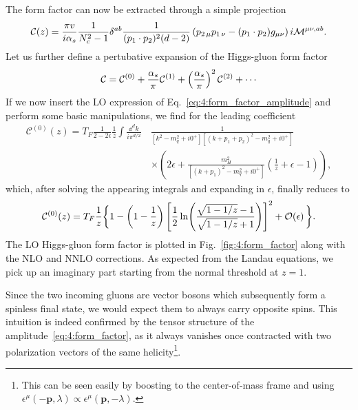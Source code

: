 The form factor can now be extracted through a simple projection
\begin{equation}
\mathcal{C}(z) = \frac{\pi v}{i \alpha_s} \frac{1}{N_c^2 - 1} \delta^{ab} \frac{1}{(p_1 \cdot p_2)^2 (d - 2)} \left(p_{2\,\mu} p_{1\,\nu} - (p_1 \cdot p_2) g_{\mu\nu} \right) i \mathcal{M}^{\mu \nu, ab}.
\end{equation}
Let us further define a pertubative expansion of the Higgs-gluon form factor
\begin{equation}
\mathcal{C} = \mathcal{C}^{(0)} + \frac{\alphas}{\pi} \mathcal{C}^{(1)} + \left( \frac{\alphas}{\pi} \right)^2 \mathcal{C}^{(2)} + \cdots
\label{eq:4:form_factor_expansion}
\end{equation}
If we now insert the \acs{LO} expression of Eq.~\eqref{eq:4:form_factor_amplitude} and perform some basic manipulations, we find for the leading coefficient
\begin{equation}
\begin{split}
\mathcal{C}^{(0)} (z) = T_F \frac{1}{2 - 2 \epsilon} \frac{1}{z} \int \frac{\dd^d k}{i \pi^{d/2}} \,&\frac{1}{[k^2 - m_q^2 + i0^+][(k + p_1 + p_2)^2 - m_q^2 + i0^+]} \\
& \times \left( 2 \epsilon + \frac{m_H^2}{[(k + p_1)^2 - m_q^2 + i0^+]} \left(\frac{1}{z} + \epsilon - 1 \right) \right),
\label{eq:4:C0_integral_form}
\end{split}
\end{equation}
which, after solving the appearing integrals and expanding in $\epsilon$, finally reduces to
\begin{equation}
\mathcal{C}^{(0)}(z) = T_F \frac{1}{z} \bigg \lbrace 1 - \left(1 - \frac{1}{z} \right) \left[ \frac{1}{2} \ln\! \left( \frac{\sqrt{1 - 1/z} - 1}{\sqrt{1 - 1/z} + 1} \right) \right]^2 + \mathcal{O}\!\left(\epsilon\right) \bigg \rbrace.
\label{eq:4:C0}
\end{equation}
The \acs{LO} Higgs-gluon form factor is plotted in Fig.~\ref{fig:4:form_factor} along with the \acs{NLO} and \acs{NNLO} corrections. As expected from the Landau equations, we pick up an imaginary part starting from the normal threshold at $z=1$.

Since the two incoming gluons are vector bosons which subsequently form a spinless final state, we would expect them to always carry opposite spins. This intuition is indeed confirmed by the tensor structure of the amplitude~\eqref{eq:4:form_factor}, as it always vanishes once contracted with two polarization vectors of the same helicity\footnote{This can be seen easily by boosting to the center-of-mass frame and using $\epsilon^\mu (-\mathbf{p}, \lambda) \propto \epsilon^\mu (\mathbf{p}, -\lambda)$.}.

